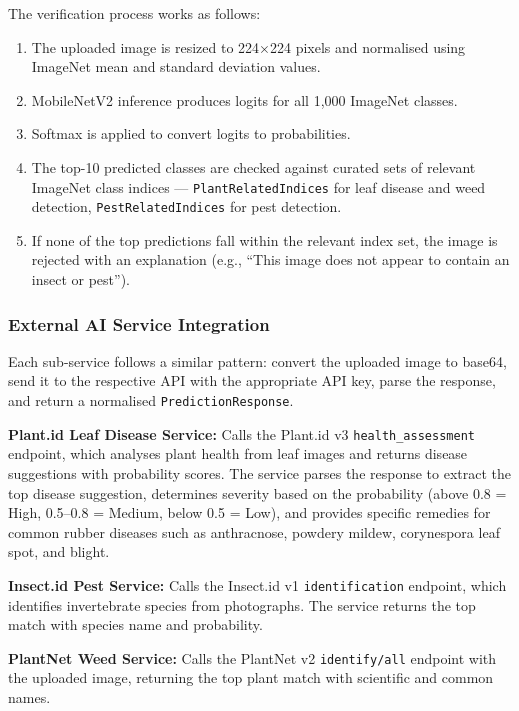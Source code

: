 The verification process works as follows:
\begin{enumerate}
    \item The uploaded image is resized to 224$\times$224 pixels and normalised using ImageNet mean and standard deviation values.
    \item MobileNetV2 inference produces logits for all 1,000 ImageNet classes.
    \item Softmax is applied to convert logits to probabilities.
    \item The top-10 predicted classes are checked against curated sets of relevant ImageNet class indices --- \texttt{PlantRelatedIndices} for leaf disease and weed detection, \texttt{PestRelatedIndices} for pest detection.
    \item If none of the top predictions fall within the relevant index set, the image is rejected with an explanation (e.g., ``This image does not appear to contain an insect or pest'').
\end{enumerate}

\subsubsection{External AI Service Integration}

Each sub-service follows a similar pattern: convert the uploaded image to base64, send it to the respective API with the appropriate API key, parse the response, and return a normalised \texttt{PredictionResponse}.

\textbf{Plant.id Leaf Disease Service:} Calls the Plant.id v3 \texttt{health\_assessment} endpoint, which analyses plant health from leaf images and returns disease suggestions with probability scores. The service parses the response to extract the top disease suggestion, determines severity based on the probability (above 0.8 = High, 0.5--0.8 = Medium, below 0.5 = Low), and provides specific remedies for common rubber diseases such as anthracnose, powdery mildew, corynespora leaf spot, and blight.

\textbf{Insect.id Pest Service:} Calls the Insect.id v1 \texttt{identification} endpoint, which identifies invertebrate species from photographs. The service returns the top match with species name and probability.

\textbf{PlantNet Weed Service:} Calls the PlantNet v2 \texttt{identify/all} endpoint with the uploaded image, returning the top plant match with scientific and common names.

